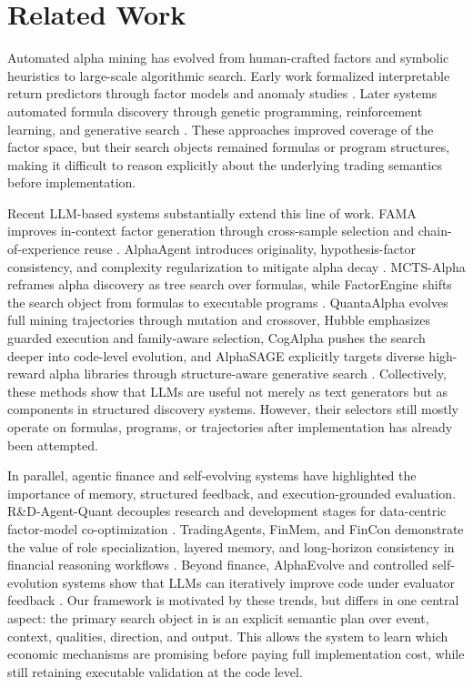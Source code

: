 \section{Related Work}
\label{sec:related_work}

Automated alpha mining has evolved from human-crafted factors and symbolic heuristics to large-scale algorithmic search. Early work formalized interpretable return predictors through factor models and anomaly studies \cite{fama1992cross,harvey2016and,hou2020replicating}. Later systems automated formula discovery through genetic programming, reinforcement learning, and generative search \cite{su2022genetic,zhang2020autoalpha,cui2021alphaevolve,yu2023alphagen,shi2025alphaforge}. These approaches improved coverage of the factor space, but their search objects remained formulas or program structures, making it difficult to reason explicitly about the underlying trading semantics before implementation.

Recent LLM-based systems substantially extend this line of work. FAMA improves in-context factor generation through cross-sample selection and chain-of-experience reuse \cite{li2024can}. AlphaAgent introduces originality, hypothesis-factor consistency, and complexity regularization to mitigate alpha decay \cite{tang2025alphaagent}. MCTS-Alpha reframes alpha discovery as tree search over formulas, while FactorEngine shifts the search object from formulas to executable programs \cite{shi2025navigating,lin2026factorengine}. QuantaAlpha evolves full mining trajectories through mutation and crossover, Hubble emphasizes guarded execution and family-aware selection, CogAlpha pushes the search deeper into code-level evolution, and AlphaSAGE explicitly targets diverse high-reward alpha libraries through structure-aware generative search \cite{han2026quantaalpha,shi2026hubble,liu2025cogalpha,chen2025alphasage}. Collectively, these methods show that LLMs are useful not merely as text generators but as components in structured discovery systems. However, their selectors still mostly operate on formulas, programs, or trajectories after implementation has already been attempted.

In parallel, agentic finance and self-evolving systems have highlighted the importance of memory, structured feedback, and execution-grounded evaluation. R\&D-Agent-Quant decouples research and development stages for data-centric factor-model co-optimization \cite{li2025rdagentquant}. TradingAgents, FinMem, and FinCon demonstrate the value of role specialization, layered memory, and long-horizon consistency in financial reasoning workflows \cite{xiao2024tradingagents,yu2025finmem,yu2024fincon}. Beyond finance, AlphaEvolve and controlled self-evolution systems show that LLMs can iteratively improve code under evaluator feedback \cite{novikov2025alphaevolve,hu2026controlled}. Our framework is motivated by these trends, but differs in one central aspect: the primary search object in \method{} is an explicit semantic plan over event, context, qualities, direction, and output. This allows the system to learn which economic mechanisms are promising before paying full implementation cost, while still retaining executable validation at the code level.
